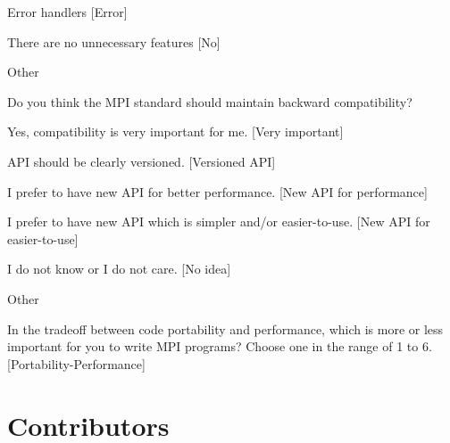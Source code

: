 \documentclass[preprint,5p,times]{elsarticle}
\def\Countries{Contributors\xspace{}}%
\begin{document}
{{\begin{description}
\begin{inparaenum}[{\bf C}1)]
    \item Error handlers [Error]
    \item There are no unnecessary features [No]
    \item Other
    \end{inparaenum}
  \item[Q28:] Do you think the MPI standard should maintain backward
    compatibility?
    \begin{inparaenum}[{\bf C}1)]
    \item Yes, compatibility is very important for me. [Very important]
    \item API should be clearly versioned. [Versioned API]
    \item I prefer to have new API for better performance. [New API for performance]
    \item I prefer to have new API which is simpler and/or
      easier-to-use. [New API for easier-to-use]
    \item I do not know or I do not care. [No idea]
    \item Other
    \end{inparaenum}
  \item[Q29:] In the tradeoff between code portability and performance,
    which is more or less important for you to write MPI programs?
    Choose one in the range of 1 to 6. [Portability-Performance]
  \end{description}
}

\section{\Countries}
\label{app:countries}

}
\end{document}
